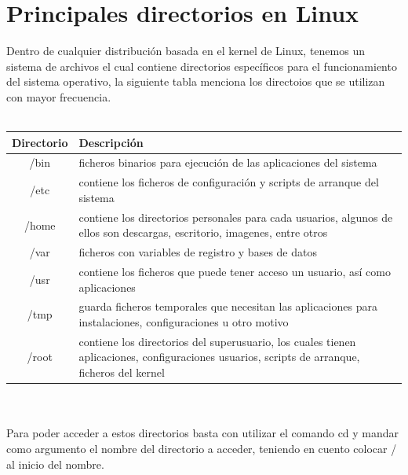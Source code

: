\documentclass[10pt,a4paper,titlepage]{article}
\begin{document}
	\section*{Principales directorios en Linux}
	Dentro de cualquier distribución basada en el kernel de Linux, tenemos un sistema de archivos el cual contiene directorios específicos para el funcionamiento del sistema operativo, la siguiente tabla menciona los directoios que se utilizan con mayor frecuencia.
	\\
	\\
	\begin{tabular}{|c|p{9cm}|}
		\hline
		Directorio & Descripción \\
		\hline
		/bin & ficheros binarios para ejecución de las aplicaciones del sistema \\
		\hline
		/etc & contiene los ficheros de configuración y scripts de arranque del sistema \\
		\hline
		/home & contiene los directorios personales para cada usuarios, algunos de ellos son descargas, escritorio, imagenes, entre otros \\
		\hline
		/var & ficheros con variables de registro y bases de datos \\
		\hline
		/usr & contiene los ficheros que puede tener acceso un usuario, así como aplicaciones \\
		\hline
		/tmp & guarda ficheros temporales que necesitan las aplicaciones para instalaciones, configuraciones u otro motivo \\
		\hline
		/root & contiene los directorios del superusuario, los cuales tienen aplicaciones, configuraciones usuarios, scripts de arranque, ficheros del kernel \\
		\hline
	\end{tabular}
	\\
	\\
	Para poder acceder a estos directorios basta con utilizar el comando cd y mandar como argumento el nombre del directorio a acceder, teniendo en cuento colocar / al inicio del nombre.
	
\end{document}
